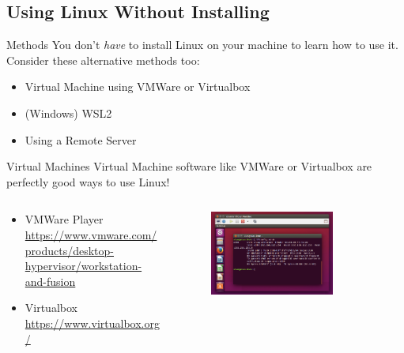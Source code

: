 \documentclass{beamer}
\begin{document}
\subsection{Using Linux Without Installing}
\begin{frame}{Methods}
	You don't \textit{have} to install Linux on your machine to learn how
	to use it. Consider these alternative methods too:
	\pause
	\begin{itemize}
		\item Virtual Machine using VMWare or Virtualbox
			\pause
		\item (Windows) WSL2
			\pause
		\item Using a Remote Server
	\end{itemize}
\end{frame}

\begin{frame}{Virtual Machines}
	Virtual Machine software like VMWare or Virtualbox are perfectly good
	ways to use Linux!

	\begin{columns}
		\begin{column}{0.5\textwidth}
			\begin{itemize}
				\item VMWare Player \url{https://www.vmware.com/products/desktop-hypervisor/workstation-and-fusion}
				\item Virtualbox \url{https://www.virtualbox.org/}
			\end{itemize}
		\end{column}
		\begin{column}{0.5\textwidth}
			\begin{figure}
				\centering
				\includegraphics[width=0.75\textwidth]{vm.png}
			\end{figure}
		\end{column}
	\end{columns}
\end{frame}
\end{document}
